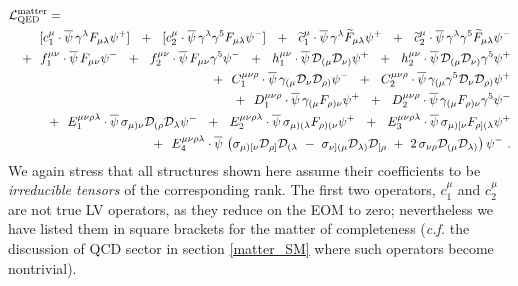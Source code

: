 \documentclass[12pt,preprintnumbers,nofootinbib]{revtex4}
\newcommand{\wt}{\widetilde}
\newcommand{\ov}{\overline}
\newcommand{\md}{\mathcal{D}}
\begin{document}
\begin{eqnarray}
\nonumber
\lefteqn{
	\mathcal{L}_{\rm QED}^{\rm matter} = 
	}
	\\
\nonumber
	&&
	\phantom{+~~}
	[c_1^{\mu}\cdot
	\ov{\psi}\, \gamma^\lambda F_{\mu\lambda} \psi {}^{+}] ~~+~~
	[c_2^{\mu}\cdot
	\ov{\psi}\, \gamma^\lambda \gamma^5 F_{\mu\lambda} \psi {}^{-}] ~~+~~
	\wt{c}_1^{\mu}\cdot
	\ov{\psi}\, \gamma^\lambda \wt{F}_{\mu\lambda} \psi {}^{+} ~~+~~
	\wt{c}_2^{\mu}\cdot
	\ov{\psi}\, \gamma^\lambda \gamma^5 \wt{F}_{\mu\lambda} \psi {}^{-}
	\\
\nonumber
	&&
	+~~
	f_1^{\mu\nu}\cdot
	\ov{\psi}\, F_{\mu\nu} \psi {}^{-} ~~+~~
	f_2^{\mu\nu}\cdot
	\ov{\psi}\, F_{\mu\nu} \gamma^5 \psi {}^{-} ~~+~~
	h_1^{\mu\nu}\cdot
	\ov{\psi}\, \mathcal{D}_{(\mu} \mathcal{D}_{\nu)} \psi {}^{+} ~~+~~
	h_2^{\mu\nu}\cdot
	\ov{\psi}\, \mathcal{D}_{(\mu} \mathcal{D}_{\nu)} \gamma^5 \psi {}^{+} 
	\\
\label{QED_matter}
	&&
	+~~
	C_1^{\mu\nu\rho}\cdot
	\ov{\psi}\, \gamma_{(\mu} 
		\mathcal{D}_\nu \mathcal{D}_{\rho)} \psi {}^{-} ~~+~~
	C_2^{\mu\nu\rho}\cdot
	\ov{\psi}\, \gamma_{(\mu} \gamma^5
	\mathcal{D}_\nu \mathcal{D}_{\rho)} \psi {}^{+} 
	\\
\nonumber
	&&
	+~~
	D_1^{\mu\nu\rho}\cdot
	\ov{\psi}\, \gamma_{(\mu} F_{\rho)\nu} \psi {}^{+} ~~+~~
	D_2^{\mu\nu\rho}\cdot
	\ov{\psi}\, \gamma_{(\mu} F_{\rho)\nu} \gamma^5 \psi {}^{-} 
	\\
\nonumber
	&&
	+~~
	E_1^{\mu\nu\rho\lambda}\cdot
	\ov{\psi}\, \sigma_{\mu)\nu} \mathcal{D}_{(\rho}\mathcal{D}_\lambda 
			\psi {}^{-} ~~+~~
	E_2^{\mu\nu\rho\lambda}\cdot
	\ov{\psi}\, \sigma_{\mu)(\lambda} F_{\rho)(\nu} \psi {}^{+} ~~+~~
	E_3^{\mu\nu\rho\lambda}\cdot
	\ov{\psi}\, \sigma_{\mu)[\nu} F_{\rho](\lambda} \psi {}^{+} 
	\\
\nonumber
	&&
	+~~
	E_4^{\mu\nu\rho\lambda}\cdot
	\ov{\psi}\, \left ( 
		\sigma_{\mu)[\nu} \mathcal{D}_{\rho]}\mathcal{D}_{(\lambda}
		~-~
		\sigma_{\nu](\mu} \mathcal{D}_{\lambda)}\mathcal{D}_{[\rho}
		~+~
		2\, \sigma_{\nu\rho} \md_{(\mu} \md_{\lambda)}
		\right ) \psi {}^{-} 
	~.
\end{eqnarray}
	We again stress that all structures shown here assume
	their coefficients to be {\it irreducible tensors} of the 
	corresponding rank. 
	The first two operators, $ c_1^\mu $ and $ c_2^\mu $ are not true
	LV operators, as they reduce on the EOM to zero; 
	nevertheless we have listed them in square brackets 
	for the matter of completeness
	({\it c.f.} the discussion of QCD sector in section \ref{matter_SM}
	where such operators become nontrivial).
\end{document}
